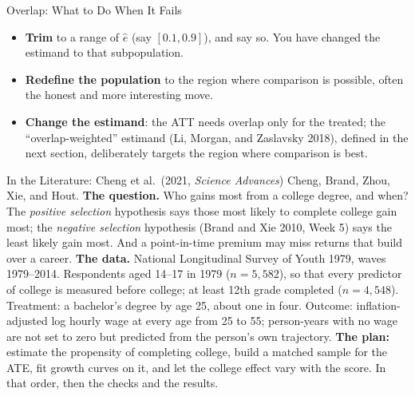 \documentclass[aspectratio=169,11pt,xcolor=dvipsnames]{beamer}
\newcommand{\srcp}[1]{{\scriptsize\color{gray}(#1)}}
\newcommand{\core}{\,\raisebox{0.6pt}{\textcolor{corestar}{$\bigstar$}}}
\begin{document}
\begin{frame}{Overlap: What to Do When It Fails\core}
\begin{center}
\end{center}
\vskip-6pt
\begin{itemize}\itemsep2pt
  \item \textbf{Trim} to a range of $\hat e$ (say $[0.1,0.9]$), and say so. You
        have changed the estimand to that subpopulation.
  \item \textbf{Redefine the population} to the region where comparison is
        possible, often the honest and more interesting move.
  \item \textbf{Change the estimand}: the ATT needs overlap only for the treated;
        the ``overlap-weighted'' estimand \srcp{Li, Morgan, and Zaslavsky 2018},
        defined in the next section, deliberately targets the region where
        comparison is best.
\end{itemize}
\end{frame}


\begin{frame}{In the Literature: Cheng et al.\ (2021, \emph{Science Advances})}
Cheng, Brand, Zhou, Xie, and Hout. \textbf{The question.} Who gains most from a college degree, and when? The
\emph{positive selection} hypothesis says those most likely to complete
college gain most; the \emph{negative selection} hypothesis (Brand and Xie
2010, Week 5) says the least likely gain most. And a point-in-time premium may
miss returns that build over a career.
\vskip3pt
\textbf{The data.} National Longitudinal Survey of Youth 1979, waves
1979--2014. Respondents aged 14--17 in 1979 ($n = 5{,}582$), so that every
predictor of college is measured before college; at least 12th grade
completed ($n = 4{,}548$). Treatment: a bachelor's degree by age 25, about one
in four. Outcome: inflation-adjusted log hourly wage at every age from 25
to 55; person-years with no wage are not set to zero but predicted from the
person's own trajectory.
\vskip3pt
\textbf{The plan:} estimate the propensity of completing college, build a
matched sample for the ATE, fit growth curves on it, and let the college effect
vary with the score. In that order, then the checks and the results.
\end{frame}
\end{document}
